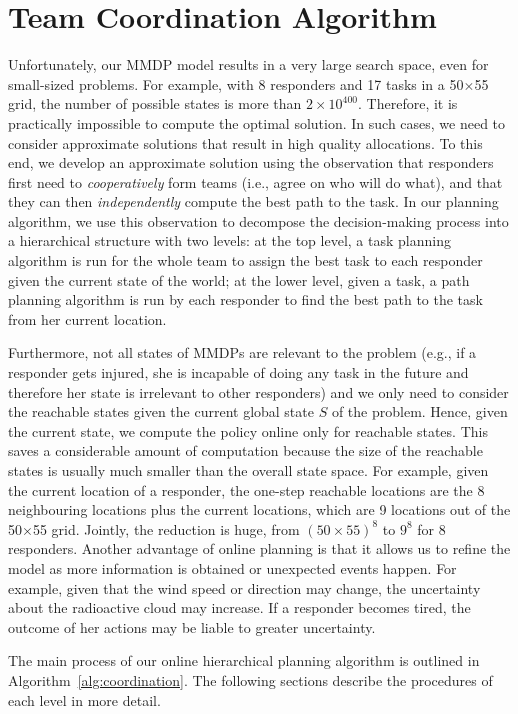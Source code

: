 \section{Team Coordination Algorithm}\label{sec:algo}
\noindent Unfortunately, our  MMDP model results in a very large search space,
even for small-sized problems. For example, with 8 responders and
17 tasks in a 50$\times$55 grid, the number of possible states is
more than $2\times 10^{400}$. Therefore, it is practically
impossible to compute the optimal solution. In such cases, we need
to consider approximate solutions that result in high quality
allocations.  To this end, we develop an
approximate solution using  the observation that responders first need to {\em cooperatively}  form teams (i.e., agree on who will do what),
and  that they can then {\em independently} compute the best path to the task.
In our planning algorithm, we use this observation to decompose the
decision-making process into a hierarchical structure with two
levels: at the top level, a task planning algorithm is run for the
whole team to assign the best task to each responder given the
current state of the world; at the lower level, given a task, a
path planning algorithm is run by each responder to find the best
path to the task from her current location.

Furthermore, not all states of MMDPs are relevant to the problem
(e.g., if a responder gets injured, she is incapable of doing any
task in the future and therefore her state is irrelevant
to other responders) and we only need to consider the reachable
states given the current global state $S$ of the problem. Hence,
given the current state, we compute the policy online only for
reachable states. This saves a considerable amount of computation
because the size of the reachable states is usually much smaller
than the overall state space. For example, given the current
location of a responder, the one-step reachable locations are the 8
neighbouring locations plus the current locations, which are 9
locations out of the 50$\times$55 grid. Jointly, the reduction is
huge, from $(50\times 55)^8$ to $9^8$ for 8 responders. Another
advantage of online planning is that it allows us to refine the
model as more information is obtained or unexpected events happen.
For example, given that the wind speed or  direction 
 may change, the uncertainty about the radioactive cloud may increase.
If a responder becomes tired, the outcome of  her actions may
be liable to greater uncertainty.

The main process of our online hierarchical planning algorithm is
outlined in Algorithm~\ref{alg:coordination}. The following
sections describe the procedures of each level in more detail.

